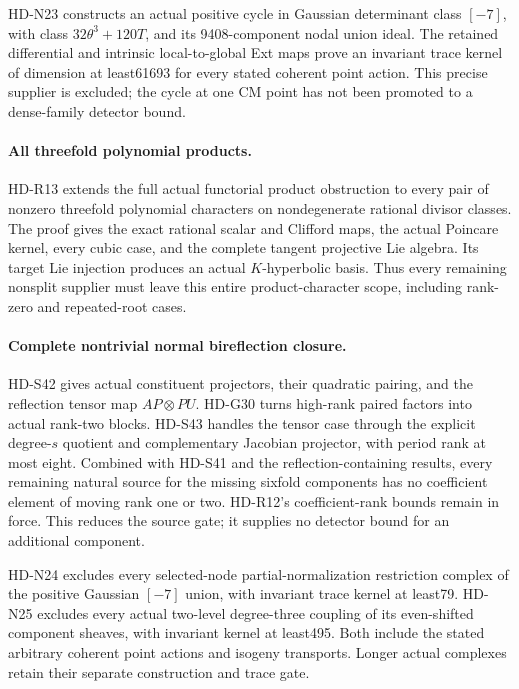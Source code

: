 HD-N23 constructs an actual positive cycle in Gaussian determinant
class \([-7]\), with class \(32\theta^3+120T\), and its
9408-component nodal union ideal. The retained differential and
intrinsic local-to-global Ext maps prove an invariant trace kernel
of dimension at least61693 for every stated coherent point action.
This precise supplier is excluded; the cycle at one CM point has
not been promoted to a dense-family detector bound.

\paragraph{All threefold polynomial products.}
HD-R13 extends the full actual functorial product obstruction
to every pair of nonzero threefold polynomial characters
on nondegenerate rational divisor classes. The proof gives
the exact rational scalar and Clifford maps, the actual
Poincare kernel, every cubic case, and the complete tangent
projective Lie algebra. Its target Lie injection produces
an actual \(K\)-hyperbolic basis. Thus every remaining
nonsplit supplier must leave this entire product-character
scope, including rank-zero and repeated-root cases.

\paragraph{Complete nontrivial normal bireflection closure.}
HD-S42 gives actual constituent projectors, their quadratic
pairing, and the reflection tensor map \(AP\otimes PU\).
HD-G30 turns high-rank paired factors into actual rank-two
blocks. HD-S43 handles the tensor case through the explicit
degree-\(s\) quotient and complementary Jacobian projector,
with period rank at most eight. Combined with HD-S41 and
the reflection-containing results, every remaining natural
source for the missing sixfold components has no coefficient
element of moving rank one or two. HD-R12's coefficient-rank
bounds remain in force. This reduces the source gate; it
supplies no detector bound for an additional component.

HD-N24 excludes every selected-node partial-normalization
restriction complex of the positive Gaussian \([-7]\) union,
with invariant trace kernel at least79. HD-N25 excludes
every actual two-level degree-three coupling of its even-shifted
component sheaves, with invariant kernel at least495.
Both include the stated arbitrary coherent point actions
and isogeny transports. Longer actual complexes retain
their separate construction and trace gate.


